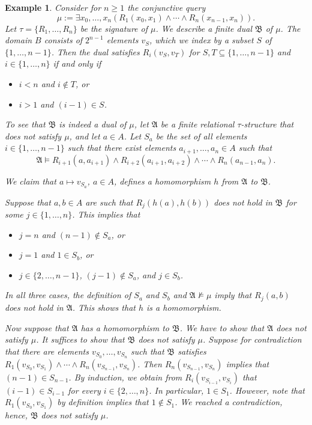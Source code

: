 \documentclass[nonacm]{acmart}
\newcommand{\bA}{{\mathfrak A}}
\newcommand{\bB}{{\mathfrak B}}
\newtheorem{expl}[theorem]{Example}
\begin{document}
\begin{expl} \label{expl:path}
Consider for $n \geq 1$ the conjunctive query 
 \[\mu := \exists x_0,\dots,x_n (R_1(x_0,x_1) \wedge \cdots \wedge R_n(x_{n-1},x_n)).\]
 Let $\tau=\{R_1, \dots, R_n\}$ be the signature of $\mu$.
 We describe a finite dual $\bB$ of $\mu$. The domain $B$ consists of $2^{n-1}$ elements $v_S$, which we index by a subset $S$ of $\{1, \dots, n-1\}$. 
Then the dual satisfies $R_i(v_S,v_T)$ for $S,T \subseteq \{1, \dots, n-1\}$ and $i \in \{1,\dots,n\}$ if and only if 
\begin{itemize}
    \item $i < n$ and $i \notin T$, or
    \item $i > 1$ and $(i-1) \in S$. 
\end{itemize}

To see that $\bB$ is indeed a dual of $\mu$, let $\bA$ be a finite relational $\tau$-structure that does not satisfy $\mu$, and let $a \in A$. Let $S_a$ be the set of all elements
$i \in \{1, \dots, n-1\}$ such that there exist elements $a_{i+1},\dots,a_n \in A$ such that 
$$\bA \models R_{i+1}(a,a_{i+1}) \wedge R_{i+2}(a_{i+1},a_{i+2}) \wedge \cdots \wedge R_n(a_{n-1},a_n).$$

We claim that $a \mapsto v_{S_a}$, $a \in A$, defines a homomorphism $h$ from $\bA$ to $\bB$.

Suppose that $a,b \in A$ are such that $R_j(h(a),h(b))$ does not hold in $\bB$ for some $j \in \{1, \dots, n\}$. 
This implies that
\begin{itemize}
    \item $j = n$ and $(n-1) \notin S_a$, or
    \item $j = 1$ and $1 \in S_b$, or
    \item $j\in \{2, \dots, n-1\}$, $(j-1) \notin S_a$, and $j \in S_b$. 
\end{itemize}
In all three cases,
the definition of $S_a$ and $S_b$ and $\bA \not\models \mu$ imply that $R_j(a,b)$ does not hold in $\bA$.
This shows that $h$ is a homomorphism.

Now suppose that $\bA$ has a homomorphism to $\bB$. We have to show that $\bA$ does not satisfy $\mu$. It suffices to show that $\bB$ does not satisfy $\mu$. Suppose for contradiction that there are elements $v_{S_0},\dots,v_{S_n}$ such that $\bB$ satisfies
$R_1(v_{S_0},v_{S_1}) \wedge \cdots \wedge R_n(v_{S_{n-1}},v_{S_n})$. Then $R_n(v_{S_{n-1}},v_{S_n})$ implies that  
$(n-1) \in S_{n-1}$. 
By induction, we obtain from $R_i(v_{S_{i-1}},v_{S_i})$ that $(i-1) \in S_{i-1}$ for every $i \in \{2, \dots, n\}$. In particular, $1 \in S_1$.
However, note that $R_1(v_{S_0},v_{S_1})$ by definition implies that $1 \notin S_1$.
We reached a contradiction, hence, $\bB$ does not satisfy $\mu$. 


\end{expl}
\end{document}
